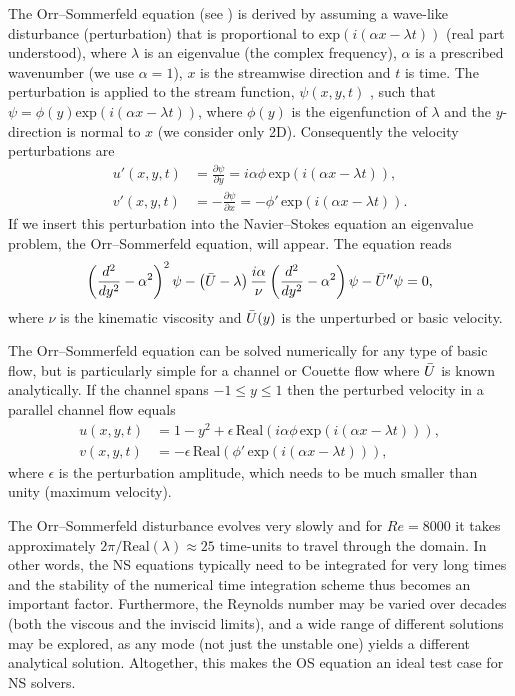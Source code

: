 The Orr--Sommerfeld equation (see \citet{Orzag1971}) is derived by
assuming a wave-like disturbance (perturbation) that is proportional
to $\text{exp}(i(\alpha x-\lambda t))$ (real part understood), where
$\lambda$ is an eigenvalue (the complex frequency), $\alpha$ is a
prescribed wavenumber (we use $\alpha=1$), $x$ is the streamwise
direction and $t$ is time. The perturbation is applied to the stream
function, $\psi(x,y,t)$ , such that $\psi=\phi(y) \text{exp}(i(\alpha
x- \lambda t))$, where $\phi(y)$ is the eigenfunction of $\lambda$ and
the $y$-direction is normal to $x$ (we consider only 2D). Consequently
the velocity perturbations are
\begin{align}
 u'(x,y,t)&=\frac{\partial \psi}{\partial y}=i\alpha \phi \, \text{exp}(i(\alpha x- \lambda t)),
\\
 v'(x,y,t)&=-\frac{\partial \psi}{\partial x}=-\phi' \, \text{exp}(i(\alpha x- \lambda t)).
\end{align}
If we insert this perturbation into the Navier--Stokes equation an
eigenvalue problem, the Orr--Sommerfeld equation, will appear. The
equation reads
\begin{equation}
 \left( \frac{d^2}{dy^2}-\alpha^2\right)^2\psi
      - \left(\Bar{U}-\lambda \right) \frac{i \alpha}{\nu}
          \left( \frac{d^2}{dy^2}-\alpha^2\right)\psi - \Bar{U}''\psi=0,
 \label{eq:mortensen:OrrS}
\end{equation}
where $\nu$ is the kinematic viscosity and $\Bar{U}(y)$ is the
unperturbed or basic velocity.

The Orr--Sommerfeld equation can be solved numerically for any type of
basic flow, but is particularly simple for a channel or Couette flow
where $\Bar{U}$ is known analytically. If the channel spans
$-1\leqslant y \leqslant 1$ then the perturbed velocity in a parallel
channel flow equals
\begin{equation}
\begin{split}
 u(x,y,t)&=1-y^2+\epsilon \,\text{Real}\left(i\alpha \phi \, \text{exp}(i(\alpha x-\lambda t))\right),
\\
 v(x,y,t)&=-\epsilon \, \text{Real}\left(\phi' \, \text{exp}(i(\alpha x-\lambda t))\right),
\end{split}
\label{eq:mortensen:channel}
\end{equation}
where $\epsilon$ is the perturbation amplitude, which needs to be much
smaller than unity (maximum velocity).

The Orr--Sommerfeld disturbance evolves very slowly and for $Re=8000$ it
takes approximately $2 \pi/\text{Real}(\lambda)\approx 25$ time-units to
travel through the domain. In other words, the NS equations typically need
to be integrated for very long times and the stability of the numerical
time integration scheme thus becomes an important factor. Furthermore,
the Reynolds number may be varied over decades (both the viscous and
the inviscid limits), and a wide range of different solutions may be
explored, as any mode (not just the unstable one) yields a different
analytical solution. Altogether, this makes the OS equation an ideal
test case for NS solvers.

